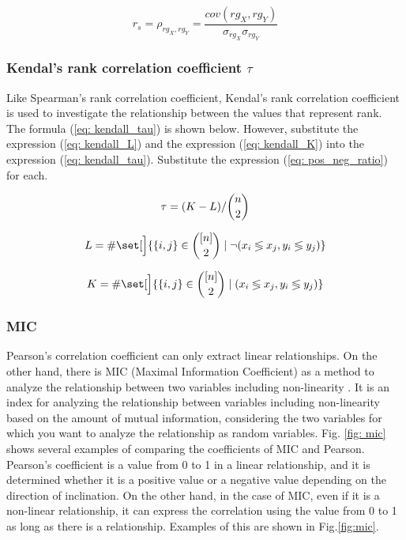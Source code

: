 \documentclass[review]{elsarticle}
\DeclarePairedDelimiter\set\{\}
\begin{document}
\begin{equation}\label{eq:spearman_rho}
r_s = \rho_{rg_X,rg_Y} = \frac{cov(rg_X,rg_Y)}{\sigma_{rg_X} \sigma_{rg_Y}}
\end{equation}

\subsubsection{Kendal's rank correlation coefficient \(\tau\)}\label{correl_kendall}

Like Spearman's rank correlation coefficient, Kendal's rank correlation coefficient is used to investigate the relationship between the values that represent rank. The formula (\ref{eq: kendall_tau}) is shown below. However, substitute the expression (\ref{eq: kendall_L}) and the expression (\ref{eq: kendall_K}) into the expression (\ref{eq: kendall_tau}). Substitute the expression (\ref{eq: pos_neg_ratio}) for each.


\begin{equation}\label{eq:kendall_tau}
\tau = (K-L)/\dbinom{n}{2}
\end{equation}

\begin{equation}\label{eq:kendall_L}
L = \# \set[\Big]{\{i,j\} \in \binom{[n]}{2} \mid \neg (x_i \lessgtr x_j, y_i \lessgtr y_j ) }
\end{equation}

\begin{equation}\label{eq:kendall_K}
K = \# \set[\Big]{\{i,j\} \in \binom{[n]}{2} \mid (x_i \lessgtr x_j, y_i \lessgtr y_j ) }
\end{equation}

\subsubsection{MIC}\label{mic}

Pearson's correlation coefficient can only extract linear relationships. On the other hand, there is MIC (Maximal Information Coefficient) as a method to analyze the relationship between two variables including non-linearity \cite[][]{Reshef2011}. It is an index for analyzing the relationship between variables including non-linearity based on the amount of mutual information, considering the two variables for which you want to analyze the relationship as random variables. Fig. \ref{fig: mic} shows several examples of comparing the coefficients of MIC and Pearson. Pearson's coefficient is a value from 0 to 1 in a linear relationship, and it is determined whether it is a positive value or a negative value depending on the direction of inclination. On the other hand, in the case of MIC, even if it is a non-linear relationship, it can express the correlation using the value from 0 to 1 as long as there is a relationship. Examples of this are shown in Fig.\ref{fig:mic}.
\end{document}
